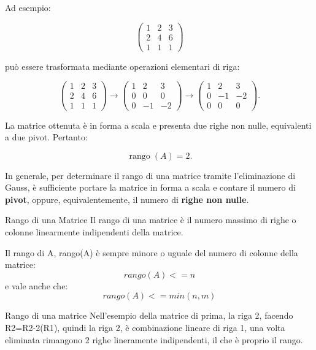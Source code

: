 Ad esempio:

\[
\begin{pmatrix}
1 & 2 & 3\\
2 & 4 & 6\\
1 & 1 & 1
\end{pmatrix}
\]

può essere trasformata mediante operazioni elementari di riga:

\[
\begin{pmatrix}
1 & 2 & 3\\
2 & 4 & 6\\
1 & 1 & 1
\end{pmatrix}
\longrightarrow
\begin{pmatrix}
1 & 2 & 3\\
0 & 0 & 0\\
0 & -1 & -2
\end{pmatrix}
\longrightarrow
\begin{pmatrix}
1 & 2 & 3\\
0 & -1 & -2\\
0 & 0 & 0
\end{pmatrix}.
\]

La matrice ottenuta è in forma a scala e presenta due righe non nulle, equivalenti a due pivot. Pertanto:

\[
\boxed{\operatorname{rango}(A)=2}.
\]

In generale, per determinare il rango di una matrice tramite l'eliminazione di Gauss, è sufficiente portare la matrice in forma a scala e contare il numero di \textbf{pivot}, oppure, equivalentemente, il numero di \textbf{righe non nulle}.
\begin{definition}{Rango di una Matrice}
Il rango di una matrice è il numero massimo di righe o colonne linearmente indipendenti della matrice.


Il rango di A, rango(A) è sempre minore o uguale del numero di colonne della matrice:
\begin{equation}
    rango(A) <= n
\end{equation}
e vale anche che:
\begin{equation}
    rango(A) <= min(n,m)
\end{equation}
\end{definition}
\begin{example}{Rango di una matrice}
    Nell'esempio della matrice di prima, la riga 2, facendo R2=R2-2(R1), quindi la riga 2, è combinazione lineare di riga 1, una volta eliminata rimangono 2 righe lineramente indipendenti,
    il che è proprio il rango.
\end{example}


